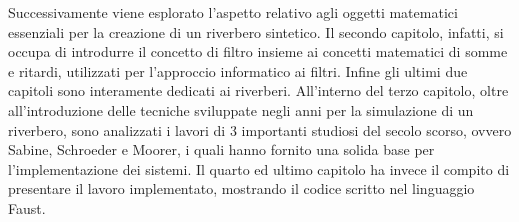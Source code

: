 Successivamente viene esplorato l’aspetto relativo agli oggetti matematici essenziali per la creazione di un riverbero sintetico. Il secondo capitolo, infatti, si occupa di introdurre il concetto di filtro insieme ai concetti matematici di somme e ritardi, utilizzati per l’approccio informatico ai filtri.
Infine gli ultimi due capitoli sono interamente dedicati ai riverberi. All’interno del terzo capitolo, oltre all’introduzione delle tecniche sviluppate negli anni per la simulazione di un riverbero, sono analizzati i lavori di 3 importanti studiosi del secolo scorso, ovvero Sabine, Schroeder e Moorer, i quali hanno fornito una solida base per l’implementazione dei sistemi. Il quarto ed ultimo capitolo ha invece il compito di presentare il lavoro implementato, mostrando il codice scritto nel linguaggio Faust.
